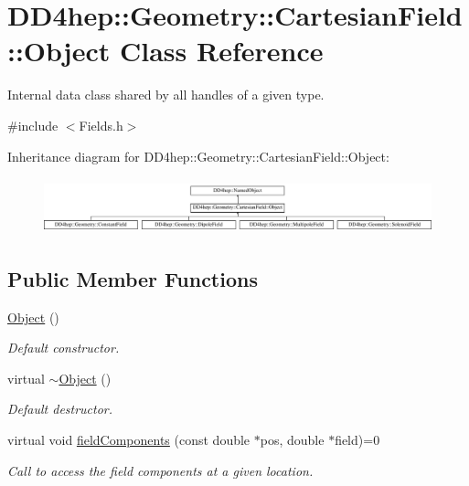 \hypertarget{class_d_d4hep_1_1_geometry_1_1_cartesian_field_1_1_object}{}\section{D\+D4hep\+:\+:Geometry\+:\+:Cartesian\+Field\+:\+:Object Class Reference}
\label{class_d_d4hep_1_1_geometry_1_1_cartesian_field_1_1_object}


Internal data class shared by all handles of a given type.  




{\ttfamily \#include $<$Fields.\+h$>$}

Inheritance diagram for D\+D4hep\+:\+:Geometry\+:\+:Cartesian\+Field\+:\+:Object\+:\begin{figure}[H]
\begin{center}
\leavevmode
\includegraphics[height=1.634241cm]{class_d_d4hep_1_1_geometry_1_1_cartesian_field_1_1_object}
\end{center}
\end{figure}
\subsection*{Public Member Functions}
\begin{DoxyCompactItemize}
\item 
\hyperlink{class_d_d4hep_1_1_geometry_1_1_cartesian_field_1_1_object_ae9c0b05f25b59b27e047ddf7538dbe2b}{Object} ()
\begin{DoxyCompactList}\small\item\em Default constructor. \end{DoxyCompactList}\item 
virtual \hyperlink{class_d_d4hep_1_1_geometry_1_1_cartesian_field_1_1_object_a8bc1219e4d9ef209dd929f96c7dfd5b4}{$\sim$\+Object} ()
\begin{DoxyCompactList}\small\item\em Default destructor. \end{DoxyCompactList}\item 
virtual void \hyperlink{class_d_d4hep_1_1_geometry_1_1_cartesian_field_1_1_object_ab3fa7f39545c8b0f769ee1ddfd03ed90}{field\+Components} (const double $\ast$pos, double $\ast$field)=0
\begin{DoxyCompactList}\small\item\em Call to access the field components at a given location. \end{DoxyCompactList}\end{DoxyCompactItemize}
